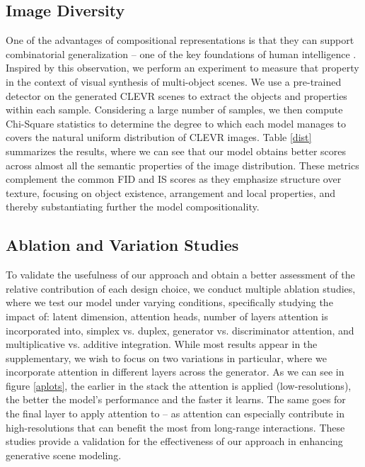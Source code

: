 \documentclass{article}
\begin{document}
\subsection{Image Diversity}
\label{dvrs} 
One of the advantages of compositional representations is that they can support combinatorial generalization -- one of the key foundations of human intelligence \cite{relational}. Inspired by this observation, we perform an experiment to measure that property in the context of visual synthesis of multi-object scenes. We use a pre-trained detector on the generated CLEVR scenes to extract the objects and properties within each sample. Considering a large number of samples, we then compute Chi-Square statistics to determine the degree to which each model manages to covers the natural uniform distribution of CLEVR images. Table \ref{dist} summarizes the results, where we can see that our model obtains better scores across almost all the semantic properties of the image distribution. These metrics complement the common FID and IS scores as they emphasize structure over texture, focusing on object existence, arrangement and local properties, and thereby substantiating further the model compositionality.

\subsection{Ablation and Variation Studies}
\label{ablt} 
To validate the usefulness of our approach and obtain a better assessment of the relative contribution of each design choice, we conduct multiple ablation  studies, where we test our model under varying conditions, specifically studying the impact of: latent dimension, attention heads, number of layers attention is incorporated into, simplex vs. duplex, generator vs. discriminator attention, and multiplicative vs. additive integration. While most results appear in the supplementary, we wish to focus on two variations in particular, where we incorporate attention in different layers across the generator. As we can see in figure \ref{aplots}, the earlier in the stack the attention is applied (low-resolutions), the better the model's performance and the faster it learns. The same goes for the final layer to apply attention to -- as attention can especially contribute in high-resolutions that can benefit the most from long-range interactions. These studies provide a validation for the effectiveness of our approach in enhancing generative scene modeling.
\end{document}
